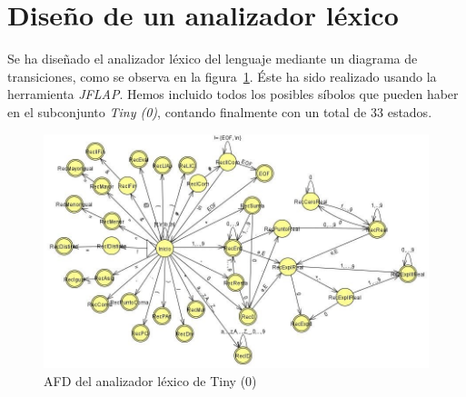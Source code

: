 \section{Diseño de un analizador léxico}

Se ha diseñado el analizador léxico del lenguaje mediante un diagrama de transiciones, como se observa en la figura~\ref{fig:diag_afd}.
Éste ha sido realizado usando la herramienta \textit{JFLAP}. Hemos incluido todos los posibles síbolos que pueden haber en
el subconjunto \textit{Tiny (0)}, contando finalmente con un total de 33 estados.

\begin{figure}[H]
    \centering
    \includegraphics[width=0.7\linewidth]{Secciones/Hito1/Tiny0/diagrama_afd.jpg}
    \caption{AFD del analizador léxico de Tiny (0)}\label{fig:diag_afd}
\end{figure}
